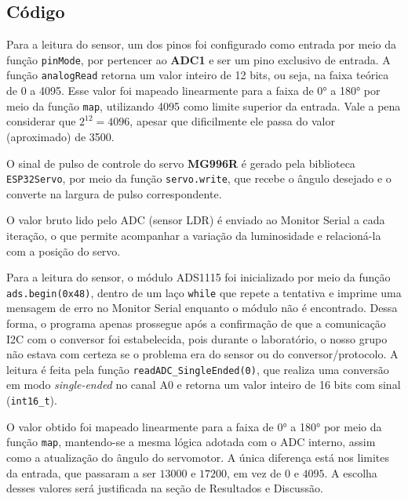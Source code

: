 \documentclass[a4paper,oneside,10pt]{article}
\begin{document}
\subsection{Código}

Para a leitura do sensor, um dos pinos foi configurado como entrada por meio da função \texttt{pinMode}, por pertencer ao \textbf{ADC1} e ser um pino exclusivo de entrada. A função \texttt{analogRead} retorna um valor inteiro de 12 bits, ou seja, na faixa teórica de 0 a 4095. Esse valor foi mapeado linearmente para a faixa de 0° a 180° por meio da função \texttt{map}, utilizando 4095 como limite superior da entrada. Vale a pena considerar que $2^{12} = 4096$, apesar que dificilmente ele passa do valor (aproximado) de 3500.

O sinal de pulso de controle do servo \textbf{MG996R} é gerado pela biblioteca \texttt{ESP32Servo}, por meio da função \texttt{servo.write}, que recebe o ângulo desejado e o converte na largura de pulso correspondente.

O valor bruto lido pelo ADC (sensor LDR) é enviado ao Monitor Serial a cada iteração, o que permite acompanhar a variação da luminosidade e relacioná-la com a posição do servo.

\pagebreak



Para a leitura do sensor, o módulo ADS1115 foi inicializado por meio da função \texttt{ads.begin(0x48)}, dentro de um laço \texttt{while} que repete a tentativa e imprime uma mensagem de erro no Monitor Serial enquanto o módulo não é encontrado. Dessa forma, o programa apenas prossegue após a confirmação de que a comunicação I2C com o conversor foi estabelecida, pois durante o laboratório, o nosso grupo não estava com certeza se o problema era do sensor ou do conversor/protocolo. A leitura é feita pela função \texttt{readADC\_SingleEnded(0)}, que realiza uma conversão em modo \textit{single-ended} no canal A0 e retorna um valor inteiro de 16 bits com sinal (\texttt{int16\_t}).

O valor obtido foi mapeado linearmente para a faixa de 0° a 180° por meio da função \texttt{map}, mantendo-se a mesma lógica adotada com o ADC interno, assim como a atualização do ângulo do servomotor. A única diferença está nos limites da entrada, que passaram a ser $13000$ e $17200$, em vez de $0$ e $4095$. A escolha desses valores será justificada na seção de Resultados e Discussão. 


\end{document}
